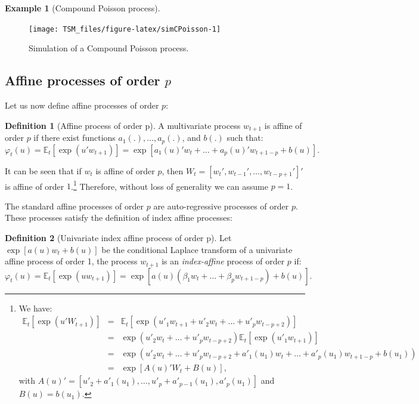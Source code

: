 \documentclass[
  12pt,
]{book}
\theoremstyle{definition}
\newtheorem{definition}{Definition}[chapter]
\theoremstyle{definition}
\newtheorem{example}{Example}[chapter]
\theoremstyle{definition}
\theoremstyle{definition}
\theoremstyle{remark}
\begin{document}
\begin{example}[Compound Poisson process]
\begin{figure}
\texttt{[image: TSM\_files/figure-latex/simCPoisson-1]} \caption{Simulation of a Compound Poisson process.}\label{fig:simCPoisson}
\end{figure}

\end{example}

\hypertarget{SubCarp}{%
\subsection{\texorpdfstring{Affine processes of order \(p\)}{Affine processes of order p}}\label{SubCarp}}

Let us now define affine processes of order \(p\):

\begin{definition}[Affine process of order p]
\protect\hypertarget{def:Carp}{}\label{def:Carp}A multivariate process \(w_{t+1}\) is affine of order \(p\) if there exist functions \(a_1(.),\dots,a_p(.)\), and \(b(.)\) such that:
\[
\varphi_t(u)=\mathbb{E}_t[\exp(u' w_{t+1})]=\exp[a_1(u)'w_t+\dots+a_p(u)'w_{t+1-p}+b(u)].
\]
\end{definition}

It can be seen that if \(w_t\) is affine of order \(p\), then \(W_t = [w_t', w_{t-1}',\dots,w_{t-p+1}']'\) is affine of order \(1\).\footnote{We have:
  \begin{eqnarray*}
  \mathbb{E}_t[\exp(u'W_{t+1})] &=& \mathbb{E}_t[\exp(u'_1 w_{t+1}+u'_2 w_t+\dots+u'_p w_{t-p+2})] \\
  &=& \exp(u'_2 w_t+\dots+u'_p w_{t-p+2})\mathbb{E}_t[\exp(u'_1 w_{t+1})] \\
  &=& \exp(u'_2 w_t+\dots+u'_p w_{t-p+2}+a'_1(u_1)
  w_t  +\dots+a'_p(u_1)w_{t+1-p}+b(u_1)) \\
  &=& \exp[A(u)'W_t+B(u)],
  \end{eqnarray*}
  with \(A(u)' = [u'_2+a'_1(u_1),\dots,u'_p+a'_{p-1}(u_1), a'_p(u_1)]\) and \(B(u) = b(u_1)\).} Therefore, without loss of generality we can assume \(p = 1\).

The standard affine processes of order \(p\) are auto-regressive processes of order \(p\). These processes satisfy the definition of index affine processes:

\begin{definition}[Univariate index affine process of order p]
Let \(\exp[a(u)w_t+b(u)]\) be the conditional Laplace transform of a univariate affine process of order 1, the process \(w_{t+1}\) is an \emph{index-affine} process of order \(p\) if:
\[
\varphi_t(u)=\mathbb{E}_t[\exp(u w_{t+1})]=\exp[a(u)(\beta_1 w_t+\dots+\beta_p
w_{t+1-p})+b(u)].
\]
\end{definition}
\end{document}
